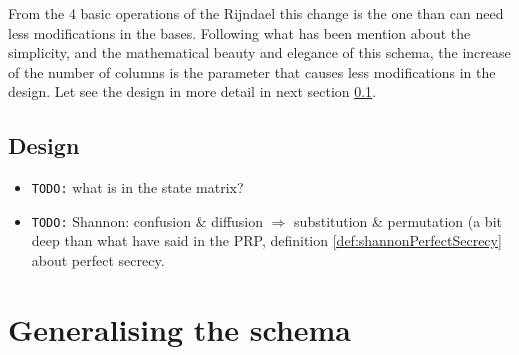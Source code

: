 \documentclass[10pt,a4paper,twoside]{llncs}
\begin{document}
From the 4 basic operations of the Rijndael this change is the one than can need less modifications in the bases. Following what has been mention about the simplicity, and the mathematical beauty and elegance of this schema, the increase of the number of columns is the parameter that causes less modifications in the design. Let see the design in more detail in next section \ref{sec:design}.


\subsection{Design}\label{sec:design}
\begin{itemize}
 \item \texttt{TODO:} what is in the state matrix?
 \item \texttt{TODO:} Shannon: confusion \& diffusion $\Rightarrow$ substitution \& permutation \cite{shannon-comTheorySecSys} (a bit deep than what have said in the PRP, definition \ref{def:shannonPerfectSecrecy} about perfect secrecy.
\end{itemize}

\section{Generalising the schema}\label{sec:generalising}
\end{document}
